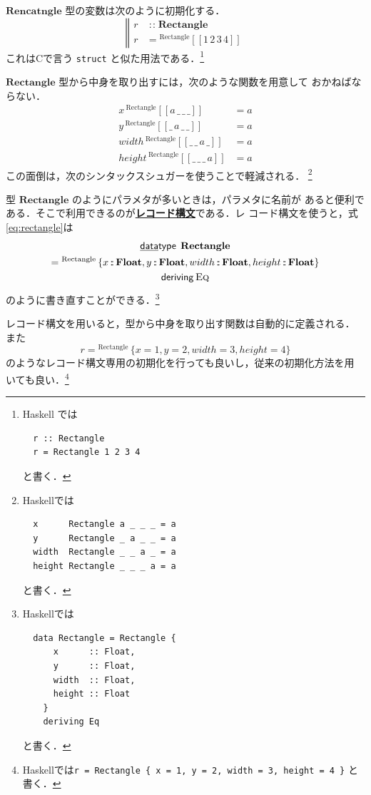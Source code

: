 \documentclass[a5paper,twoside,fleqn,draft]{jsbook}
\def\[{[\![}
\def\]{]\!]}
\newcommand{\programminglanguage}[1]{\textsf{#1}}
\newcommand{\clang}{\programminglanguage{C}}
\newcommand{\haskell}{\programminglanguage{Haskell}}
\newcommand{\keyword}[1]{{\underline{\textbf{#1}}}}
\newcommand{\code}[1]{\texttt{#1}}
\newcommand{\mBrace}{\Vert}
\newcommand{\mKeyword}[1]{\mathsf{#1}}
\newcommand{\mKeywordUnderline}[1]{\text{\underline{\textsf{#1}}}}
\newcommand{\mDataTypeKeyword}{\mKeywordUnderline{data}\mKeyword{type}}
\newcommand{\mDerivingKeyword}{\mKeyword{deriving}}
\DeclareMathOperator{\mDataType}{\mDataTypeKeyword}
\DeclareMathOperator{\mDeriving}{\mDerivingKeyword}
\DeclareMathOperator{\mIn}{{:\!:}}
\newcommand{\mType}[1]{\mathbf{#1}} %
\newcommand{\mFloatType}{\mType{Float}}
\newcommand{\mValueConstructor}[1]{\mathrm{#1}}
\newcommand{\mValueWith}[2]{{}^\mValueConstructor{#1}\[#2\]}
\newcommand{\mValueRecordBeginWith}[1]{{}^\mValueConstructor{#1}\,\{}
\newcommand{\mValueRecordEnd}{\}}
\newcommand{\mValueRecordWith}[2]{\mValueRecordBeginWith{#1}{#2}\mValueRecordEnd}
\newcommand{\mTypeClass}[1]{\textsc{#1}} %
\newcommand{\mEqTypeClass}{\mTypeClass{Eq}}
\begin{document}
$\mType{Rencatngle}$ 型の変数は次のように初期化する．
\begin{equation}
  \left\mBrace
  \begin{aligned}
    r&\mIn\mType{Rectangle}\\
    r&=\mValueWith{Rectangle}{1\,2\,3\,4}
  \end{aligned}
  \right.
\end{equation}
これは\clang で言う \code{struct} と似た用法である．\footnote{\haskell
では
\begin{verbatim}
  r :: Rectangle
  r = Rectangle 1 2 3 4
\end{verbatim}
と書く．}

$\mType{Rectangle}$ 型から中身を取り出すには，次のような関数を用意して
おかねばならない．
\begin{align}
  x\,\mValueWith{Rectangle}{a\,\_\,\_\,\_}
  &=a\\
  y\,\mValueWith{Rectangle}{\_\,a\,\_\,\_}
  &=a\\
  width\,\mValueWith{Rectangle}{\_\,\_\,a\,\_}
  &=a\\
  height\,\mValueWith{Rectangle}{\_\,\_\,\_\,a}
  &=a
\end{align}
この面倒は，次のシンタックスシュガーを使うことで軽減される．
\footnote{\haskell では
\begin{verbatim}
  x      Rectangle a _ _ _ = a
  y      Rectangle _ a _ _ = a
  width  Rectangle _ _ a _ = a
  height Rectangle _ _ _ a = a
\end{verbatim}
と書く．}

型 $\mType{Rectangle}$ のようにパラメタが多いときは，パラメタに名前が
あると便利である．そこで利用できるのが\keyword{レコード構文}である．レ
コード構文を使うと，式\eqref{eq:rectangle}は
\begin{multline}
  \mDataType\;\mType{Rectangle}\\
  =\mValueRecordBeginWith{Rectangle}
  x\mIn\mFloatType,
  y\mIn\mFloatType,
  width\mIn\mFloatType,
  height\mIn\mFloatType
  \mValueRecordEnd\\
  \mDeriving\mEqTypeClass
\end{multline}
のように書き直すことができる．\footnote{\haskell では
\begin{verbatim}
  data Rectangle = Rectangle {
      x      :: Float,
      y      :: Float,
      width  :: Float,
      height :: Float
    }
    deriving Eq
\end{verbatim}
と書く．}

レコード構文を用いると，型から中身を取り出す関数は自動的に定義される．
また
\begin{equation}
  r=
  \mValueRecordWith{Rectangle}{
    x=1,
    y=2,
    width=3,
    height=4
  }
\end{equation}
のようなレコード構文専用の初期化を行っても良いし，従来の初期化方法を用
いても良い．\footnote{\haskell では\code{r = Rectangle \{ x = 1, y =
    2, width = 3, height = 4 \}} と書く．}
\end{document}

